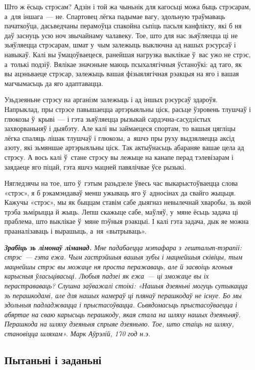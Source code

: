 Што ж ёсьць стрэсам? Адзін і той жа чыньнік для кагосьці можа быць стрэсарам, а~для іншага~--- не. Спартовец лёгка падымае вагу, здольную траўмаваць пачаткоўца, дасьведчаны перамоўца спакойна сьпіць пасьля канфлікту, які б ня даў заснуць усю ноч звычайнаму чалавеку. Тое, што для нас зьяўляецца ці не зьяўляецца стрэсарам, шмат у~чым залежыць выключна ад нашых рэсурсаў і навыкаў. Калі вы ўмацоўваецеся, ранейшая нагрузка выклікае ў~вас ужо не стрэс, а~толькі подзіў. Вялікае значэньне маюць псыхалягічныя ўстаноўкі: ад таго, як вы ацэньваеце стрэсар, залежыць вашая фізыялягічная рэакцыя на яго і вашая магчымасьць да яго адаптавацца.

Узьдзеяньне стрэсу на арганізм залежыць і ад іншых рэсурсаў здароўя. Напрыклад, пры стрэсе павышаецца артэрыяльны ціск, расьце ўзровень тлушчаў і глюкозы ў~крыві~--- і гэта зьяўляецца рызыкай сардэчна-сасудзістых захворваньняў і дыябэту. Але калі вы займаецеся спортам, то вашыя цягліцы лёгка спаляць лішак тлушчаў і глюкозы, а~яшчэ пры руху выдзяляецца аксід азоту, які зьмяншае артэрыяльны ціск. Так актыўнасьць абараняе вашае цела ад стрэсу. А вось калі ў~стане стрэсу вы лежыце на канапе перад тэлевізарам і заядаеце яго піцай, гэта яшчэ мацней павялічвае ўсе рызыкі.

Нягледзячы на тое, што ў~гэтым разьдзеле ўвесь час выкарыстоўваецца слова «стрэс», я б рэкамэндаваў менш ужываць яго ў~адносінах да свайго жыцьця. Кажучы «стрэс», мы як быццам ставім сабе дыягназ невылечнай хваробы, зь якой трэба зьмірыцца й жыць. Лепш скажыце сабе, маўляў, у~мяне ёсьць задача ці праблема, што выклікае ў~мяне пэўныя рэакцыі. І калі гэта задача, дык яе можна прааналізаваць і вырашыць, а~ня «вытрываць».

\emph{\textbf{Зрабіць зь лімонаў ліманад.} Мне падабаецца мэтафара з~гештальт-тэрапіі: стрэс~--- гэта ежа. Чым гастрэйшыя вашыя зубы і мацнейшыя сківіцы, тым мацнейшы стрэс вы можаце ня проста перажаваць, але й засвоіць ягоныя карысныя ўласьцівасьці. Любыя падзеі як ежа~--- ці зможаце вы іх перастрававаць? Слушна заўважалі стоікі: «Нашыя дзеяньні могуць сутыкацца зь перашкодамі, але для нашых намераў ці плянаў перашкодаў не існуе. Бо мы здольныя падладжвацца і прыстасоўвацца. Сьвядомасьць прыстасоўваецца і абяртае на сваю карысьць перашкоду, якая стала на шляху нашых дзеяньняў. Перашкода на шляху дзеяньня спрыяе дзеяньню. Тое, што стаіць на шляху, становіцца шляхам». Марк Аўрэлій, 170 год н.э.}

\subsection*{Пытаньні і заданьні}

